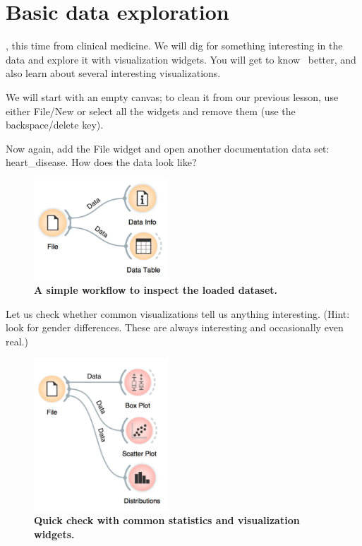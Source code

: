 \chapter{Basic data exploration}
\label{ch:basic_data_exploration}

, this time from clinical me\-di\-cine. We will dig for something interesting in the data and explore it with visualization widgets. You will get to know \mutation\ better, and also learn about several interesting visualizations.

We will start with an empty canvas; to clean it from our previous lesson, use either File/New or select all the widgets and remove them (use the backspace/delete key).

Now again, add the File widget and open another documentation data set: heart\_disease. How does the data look like?

\begin{figure}[h]
  \centering
  \includegraphics[width=50mm]{basic_data_exploration-fig1.png}%
  \caption{\textbf{\textsf{A simple workflow to inspect the loaded dataset.}}}
  \label{fig:basic_data_exploration-fig1}
\end{figure}

Let us check whether common visualizations tell us anything interesting. (Hint: look for gender differences. These are always interesting and occasionally even real.)

\begin{figure}[h]
  \centering
  \includegraphics[width=50mm]{basic_data_exploration-fig2.png}%
  \caption{\textbf{\textsf{Quick check with common statistics and visualization widgets.}}}
  \label{fig:basic_data_exploration-fig2}
\end{figure}

